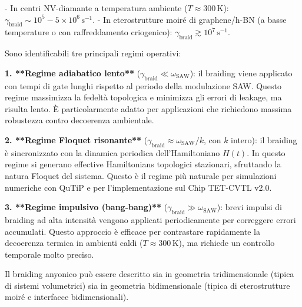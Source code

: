 \documentclass[11pt,a4paper]{article}
\theoremstyle{plain}
\theoremstyle{definition}
\begin{document}
- In centri NV-diamante a temperatura ambiente ($T \approx 300\,\text{K}$): $\gamma_{\text{braid}} \sim 10^5 - 5 \times 10^6\,\text{s}^{-1}$.
- In eterostrutture moiré di graphene/h-BN (a basse temperature o con raffreddamento criogenico): $\gamma_{\text{braid}} \gtrsim 10^7\,\text{s}^{-1}$.

\vspace{0.6cm}

Sono identificabili tre principali regimi operativi:

\vspace{0.4cm}

\textbf{1. **Regime adiabatico lento**} ($\gamma_{\text{braid}} \ll \omega_{\text{SAW}}$): il braiding viene applicato con tempi di gate lunghi rispetto al periodo della modulazione SAW. Questo regime massimizza la fedeltà topologica e minimizza gli errori di leakage, ma risulta lento. È particolarmente adatto per applicazioni che richiedono massima robustezza contro decoerenza ambientale.



\vspace{0.2cm}

\textbf{2. **Regime Floquet risonante** }($\gamma_{\text{braid}} \approx \omega_{\text{SAW}}/k$, con $k$ intero): il braiding è sincronizzato con la dinamica periodica dell’Hamiltoniano $H(t)$. In questo regime si generano effective Hamiltonians topologici stazionari, sfruttando la natura Floquet del sistema. Questo è il regime più naturale per simulazioni numeriche con QuTiP e per l’implementazione sul Chip TET-CVTL v2.0.

\vspace{0.2cm}

\textbf{3. **Regime impulsivo (bang-bang)** }($\gamma_{\text{braid}} \gg \omega_{\text{SAW}}$): brevi impulsi di braiding ad alta intensità vengono applicati periodicamente per correggere errori accumulati. Questo approccio è efficace per contrastare rapidamente la decoerenza termica in ambienti caldi ($T \approx 300\,\text{K}$), ma richiede un controllo temporale molto preciso.




\clearpage



Il braiding anyonico può essere descritto sia in geometria tridimensionale (tipica di sistemi volumetrici) sia in geometria bidimensionale (tipica di eterostrutture moiré e interfacce bidimensionali). 

\vspace{0.2cm}
\end{document}
